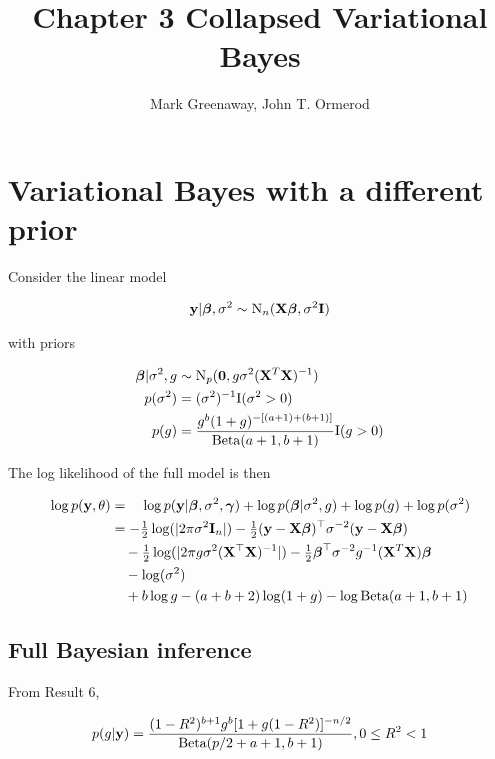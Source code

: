\documentclass{amsart}[12pt]
\title{Chapter 3 Collapsed Variational Bayes}
\author{Mark Greenaway, John T. Ormerod}
\begin{document}
\section{Variational Bayes with a different prior}

Consider the linear model

\begin{align*}
	{\bf y} | {\boldsymbol \beta}, \sigma^2 \sim \text{N}_n({\bf X} {\boldsymbol \beta}, \sigma^2 {\bf I}) 
\end{align*}

with priors

\begin{align*}
	{\boldsymbol\beta} | \sigma^2, g & \sim \text{N}_p({\bf 0}, g \sigma^2 ({\bf X}^T {\bf X})^{-1})                             \\
	p(\sigma^2)          & = (\sigma^2)^{-1} \text{I}(\sigma^2 > 0)                                         \\
	p(g)                 & = \frac{g^b (1 + g)^{-[(a + 1) + (b + 1)]}}{\text{Beta}(a + 1, b + 1)} \text{I}(g > 0) 
\end{align*}

The log likelihood of the full model is then

\begin{align*}
	\log p({\bf y}, \theta) & = \quad\log p({\bf y}|{\boldsymbol \beta}, \sigma^2, {\boldsymbol \gamma}) + \log p({\boldsymbol \beta} | \sigma^2, g) +  \log p(g) + \log p(\sigma^2)        \\
	                    & = -\tfrac{1}{2} \log(|2 \pi \sigma^2 {\bf I}_n|) - \tfrac{1}{2} ({\bf y} - {\bf X} {\boldsymbol \beta})^\top \sigma^{-2} ({\bf y} - {\bf X} {\boldsymbol \beta})               \\
	                    & \quad -\tfrac{1}{2} \log(|2 \pi g \sigma^2 ({\bf X}^\top {\bf X})^{-1}|) -\tfrac{1}{2} {\boldsymbol \beta}^\top \sigma^{-2} g^{-1} ({\bf X}^T {\bf X}) {\boldsymbol \beta} \\
	                    & \quad - \log (\sigma^2)                                                                                            \\
	                    & \quad + b \log g - (a + b + 2) \log (1 + g) - \log \text{Beta}(a + 1, b + 1)                                             
\end{align*}


\subsection{Full Bayesian inference}

From Result 6,

\[
	p(g|{\bf y}) = \frac{(1-R^2)^{b+1} g^b [1 + g(1-R^2)]^{-n/2}}{\text{Beta}{(p/2 + a + 1, b + 1)}}, 0 \leq R^2 < 1
\]
\end{document}
